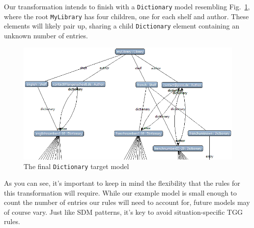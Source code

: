 \newpage

Our transformation intends to finish with a \texttt{Dictionary} model resembling Fig.~\ref{eclipse:dictionaryStart}, where the root \texttt{MyLibrary} has
four children, one for each shelf and author. These elements will likely pair up, sharing a child \texttt{Dictionary} element containing an unknown number
of entries.

\vspace{1cm}

\begin{figure}[htbp]
\hspace{-1.5cm}
    \includegraphics[width=1.2\textwidth]{eclipse_DictionaryResultMetamodel}
 	\caption{The final \texttt{Dictionary} target model}
 	\label{eclipse:dictionaryStart}
\end{figure}

\vspace{1cm}

As you can see, it's important to keep in mind the flexibility that the rules for this transformation will require. While our example model is small
enough to count the number of entries our rules will need to account for, future models may of course vary. Just like SDM patterns, it's key to avoid
situation-specific TGG rules.







